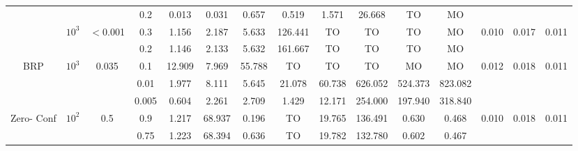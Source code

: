 \begin{table}
\begin{lrbox}{\lstbox}
\begin{minipage}{\textheight}
\begin{tabular}{ccccccccccccccc}
				                                               &                            &                           & 0.2                      & 0.013       & 0.031        & 0.657       & 0.519    & 1.571   & 26.668  & TO      & MO                                                                                               \\
				\cmidrule[0.5pt](r){2-15}
				                                               & \multirow{2}{*}{$10^3$}    & \multirow{2}{*}{$<$0.001} & 0.3                      & 1.156       & 2.187        & 5.633       & 126.441  & TO      & TO      & TO      & MO      & \multirow{2}{*}{0.010}             & \multirow{2}{*}{0.017}   & \multirow{2}{*}{0.011} \\
				                                               &                            &                           & 0.2                      & 1.146       & 2.133        & 5.632       & 161.667  & TO      & TO      & TO      & MO                                                                                               \\
				\midrule
				\multirow{3}{*}{BRP}                           & \multirow{3}{*}{$10^3$}    & \multirow{3}{*}{0.035}    & 0.1                      & 12.909      & 7.969        & 55.788      & TO       & TO      & TO      & MO      & MO      & \multirow{3}{*}{0.012}             & \multirow{3}{*}{0.018}   & \multirow{3}{*}{0.011} \\
				                                               &                            &                           & \cellcolor{gray!25}0.01  & 1.977       & 8.111        & 5.645       & 21.078   & 60.738  & 626.052 & 524.373 & 823.082                                                                                          \\
				                                               &                            &                           & \cellcolor{gray!25}0.005 & 0.604       & 2.261        & 2.709       & 1.429    & 12.171  & 254.000 & 197.940 & 318.840                                                                                          \\
				\midrule
				\multirow{8}{*}{\parbox{4em}{Zero- Conf}}      & \multirow{4}{*}{$10^2$}    & \multirow{4}{*}{0.5}      & 0.9                      & 1.217       & 68.937       & 0.196       & TO       & 19.765  & 136.491 & 0.630   & 0.468   & \multirow{4}{*}{0.010}             & \multirow{4}{*}{0.018}   & \multirow{4}{*}{0.011} \\
				                                               &                            &                           & 0.75                     & 1.223       & 68.394       & 0.636       & TO       & 19.782  & 132.780 & 0.602   & 0.467                                                                                            \\

\end{tabular}
\end{minipage}
\end{lrbox}
\end{table}

